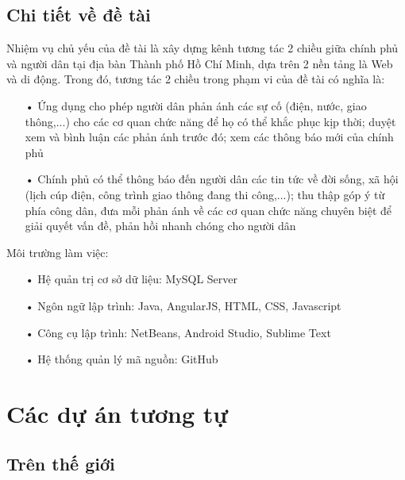 \documentclass[a4paper]{article}
\begin{document}
\subsection{Chi tiết về đề tài}
Nhiệm vụ chủ yếu của đề tài là xây dựng kênh tương tác 2 chiều giữa chính phủ và người dân tại địa bàn Thành phố Hồ Chí Minh, dựa trên 2 nền tảng là Web và di động. Trong đó, tương tác 2 chiều trong phạm vi của đề tài có nghĩa là:
\begin{itemize}
     \item[•]Ứng dụng cho phép người dân phản ánh các sự cố (điện, nước, giao thông,...) cho các cơ quan chức năng để họ có thể khắc phục kịp thời; duyệt xem và bình luận các phản ánh trước đó; xem các thông báo mới của chính phủ 
     \item[•]Chính phủ có thể thông báo đến người dân các tin tức về đời sống, xã hội (lịch cúp điện, công trình giao thông đang thi công,...); thu thập góp ý từ phía công dân, đưa mỗi phản ánh về các cơ quan chức năng chuyên biệt để giải quyết vấn đề, phản hồi nhanh chóng cho người dân
\end{itemize}
Môi trường làm việc:
\begin{itemize}
	\item[•]Hệ quản trị cơ sở dữ liệu: MySQL Server
	\item[•]Ngôn ngữ lập trình: Java, AngularJS, HTML, CSS, Javascript
	\item[•]Công cụ lập trình: NetBeans, Android Studio, Sublime Text
	\item[•]Hệ thống quản lý mã nguồn: GitHub
\end{itemize}
\section{Các dự án tương tự}
\subsection{Trên thế giới}
\end{document}

